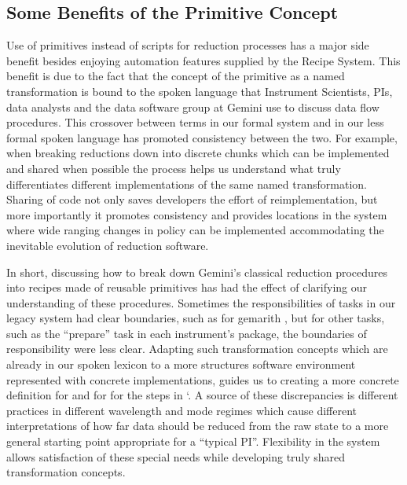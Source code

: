 \documentclass[letterpaper,10pt,english]{sphinxmanual}
\begin{document}
\subsection{Some Benefits of the Primitive Concept}
\label{gen.ADMANUAL_ADConcepts:some-benefits-of-the-primitive-concept}
Use of primitives instead of scripts for reduction processes has a
major side benefit besides enjoying automation features supplied by
the Recipe System. This benefit is due to the fact that the concept of
the primitive as a named transformation is bound to the spoken
language that Instrument Scientists, PIs, data analysts and the data
software group at Gemini use to discuss data flow procedures. This
crossover between terms in our formal system and in our less formal
spoken language has promoted consistency between the two. For example,
when breaking reductions down into discrete chunks which can be
implemented and shared when possible the process helps us understand
what truly differentiates different implementations of the same named
transformation. Sharing of code not only saves developers the effort
of reimplementation, but more importantly it promotes consistency and
provides locations in the system where wide ranging changes in policy
can be implemented accommodating the inevitable evolution of reduction
software.

In short, discussing how to break down Gemini's classical reduction
procedures into recipes made of reusable primitives has had the effect
of clarifying our understanding of these procedures. Sometimes the
responsibilities of tasks in our legacy system had clear boundaries,
such as for gemarith , but for other tasks, such as the ``prepare'' task
in each instrument's package, the boundaries of responsibility were
less clear. Adapting such transformation concepts which are already in
our spoken lexicon to a more structures software environment
represented with concrete implementations, guides us to creating a
more concrete definition for  and for for the steps in
`. A source of these discrepancies is different practices
in different wavelength and mode regimes which cause different
interpretations of how far data should be reduced from the raw state
to a more general starting point appropriate for a ``typical PI''.
Flexibility in the system allows satisfaction of these special needs
while developing truly shared transformation concepts.
\end{document}
